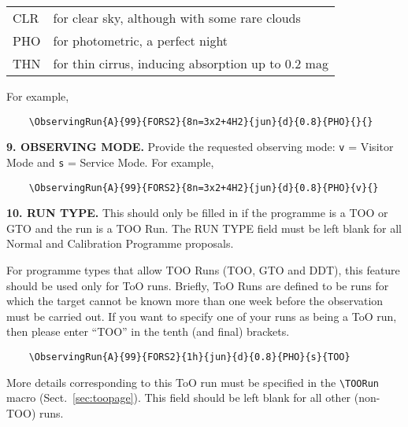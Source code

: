 \documentclass{article}
\begin{document}
\smallskip

\begin{tabular}{ll}
  CLR & for clear sky, although with some rare clouds \\
  PHO & for photometric, a perfect night \\
  THN & for thin cirrus, inducing absorption up to 0.2 mag \\
\end{tabular}

\smallskip

For example, 
\begin{verbatim}
    \ObservingRun{A}{99}{FORS2}{8n=3x2+4H2}{jun}{d}{0.8}{PHO}{}{}
\end{verbatim}

\medskip

{\bf 9.  OBSERVING MODE.} Provide the requested observing mode:
\verb|v| = Visitor Mode and \verb|s| = Service Mode. For example,
\begin{verbatim}
    \ObservingRun{A}{99}{FORS2}{8n=3x2+4H2}{jun}{d}{0.8}{PHO}{v}{}
\end{verbatim}

{\bf 10.  RUN TYPE.}
This should only be filled in if the programme is a TOO or GTO 
and the run is a TOO Run.  The RUN TYPE field must be left blank 
for all Normal and Calibration Programme proposals.

For programme types that allow TOO Runs (TOO, GTO and DDT), this feature
should be used only for ToO runs.
Briefly, ToO Runs are defined to be runs for which the target cannot be known more than
one week before the observation must be carried out.
If you want to specify one of your runs 
as being a ToO run, then please enter ``TOO'' in the tenth (and final) brackets.

\begin{verbatim}
    \ObservingRun{A}{99}{FORS2}{1h}{jun}{d}{0.8}{PHO}{s}{TOO}
\end{verbatim}

More details corresponding to this ToO run must be specified in the
\verb|\TOORun| macro (Sect.~\ref{sec:toopage}).
This field should be left blank for all other (non-TOO) runs.
\end{document}
